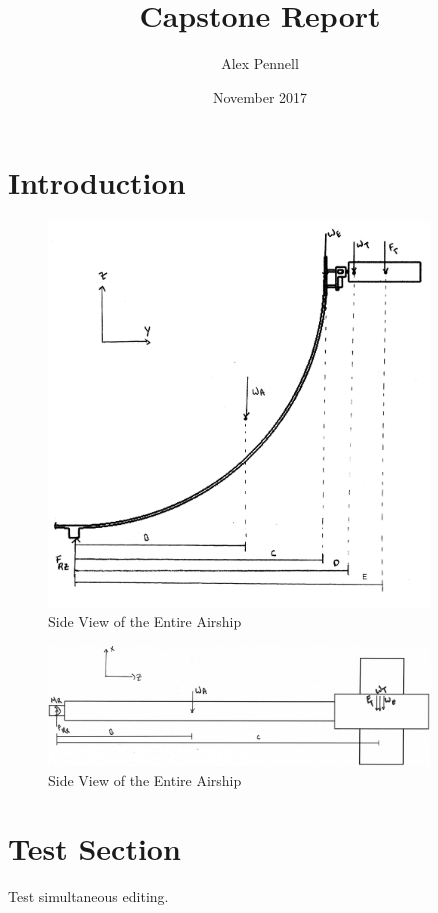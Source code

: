 \documentclass[12pt]{article}
\title{Capstone Report}
\author{Alex Pennell}
\date{November 2017}
\begin{document}
\maketitle

\section{Introduction}

\begin{figure}
	\centering
	\includegraphics[width=0.9\textwidth]{Thruster/ArmThrustDonwards.png}
	\caption{Side View of the Entire Airship}
	\label{fig:ArmThrust}
\end{figure}

\begin{figure}
	\centering
	\includegraphics[width=0.9\textwidth]{Thruster/ArmDown.png}
	\caption{Side View of the Entire Airship}
	\label{fig:ArmDown}
\end{figure}

\section{Test Section}

Test simultaneous editing.
\end{document}
